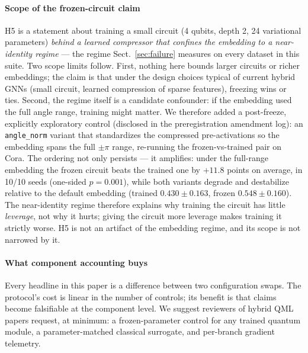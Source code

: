 \documentclass[pdflatex,sn-mathphys-num]{sn-jnl}
\begin{document}
\paragraph{Scope of the frozen-circuit claim} H5 is a statement about training a small circuit (4 qubits, depth 2, 24 variational parameters) \emph{behind a learned compressor that confines the embedding to a near-identity regime} --- the regime Sect.~\ref{sec:failure} measures on every dataset in this suite. Two scope limits follow. First, nothing here bounds larger circuits or richer embeddings; the claim is that under the design choices typical of current hybrid GNNs (small circuit, learned compression of sparse features), freezing wins or ties. Second, the regime itself is a candidate confounder: if the embedding used the full angle range, training might matter. We therefore added a post-freeze, explicitly exploratory control (disclosed in the preregistration amendment log): an \texttt{angle\_norm} variant that standardizes the compressed pre-activations so the embedding spans the full $\pm\pi$ range, re-running the frozen-vs-trained pair on Cora. The ordering not only persists --- it amplifies: under the full-range embedding the frozen circuit beats the trained one by $+11.8$ points on average, in 10/10 seeds (one-sided $p=0.001$), while both variants degrade and destabilize relative to the default embedding (trained $0.430\pm0.163$, frozen $0.548\pm0.160$). The near-identity regime therefore explains why training the circuit has little \emph{leverage}, not why it hurts; giving the circuit more leverage makes training it strictly worse. H5 is not an artifact of the embedding regime, and its scope is not narrowed by it.

\paragraph{What component accounting buys} Every headline in this paper is a difference between two configuration swaps. The protocol's cost is linear in the number of controls; its benefit is that claims become falsifiable at the component level. We suggest reviewers of hybrid QML papers request, at minimum: a frozen-parameter control for any trained quantum module, a parameter-matched classical surrogate, and per-branch gradient telemetry.
\end{document}
